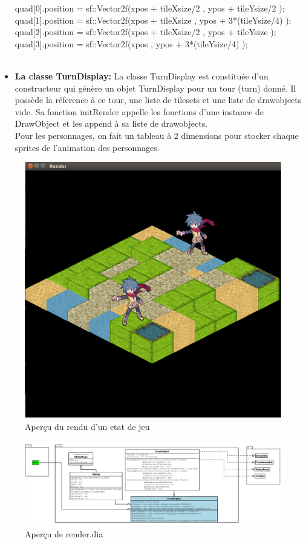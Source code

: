 \begin{itemize}
                quad[0].position = sf::Vector2f(xpos + tileXsize/2     , ypos + tileYsize/2    );
                \\quad[1].position = sf::Vector2f(xpos + tileXsize     , ypos + 3*(tileYsize/4)     );
                \\quad[2].position = sf::Vector2f(xpos + tileXsize/2   , ypos + tileYsize         );
                \\quad[3].position = sf::Vector2f(xpos                 , ypos + 3*(tileYsize/4)   );
\\
\\
    \item \textbf{La classe TurnDisplay:} La classe TurnDisplay est 
    constituée d'un constructeur qui génère un objet TurnDisplay pour un tour (turn) donné. 
    Il possède la réference à ce tour,
    une liste de tilesets et une liste de drawobjects vide.
    Sa fonction initRender appelle 
    les fonctions d'une instance de DrawObject 
    et les append à sa liste de drawobjects. 
    \\
    Pour les personnages, on fait un tableau à 2 dimensions pour
    stocker chaque sprites de l'animation des personnages.
\end{itemize}

\begin{figure}[H]
\includegraphics[width=\linewidth]{images/RenderPreview.png}
\centering
\caption{Aperçu du rendu d'un etat de jeu}
\label{fig:img4}
\end{figure}

\begin{figure}[H]
\includegraphics[width=\linewidth]{images/renderdia.png}
\centering
\caption{Aperçu de render.dia}
\label{fig:img5}
\end{figure}
